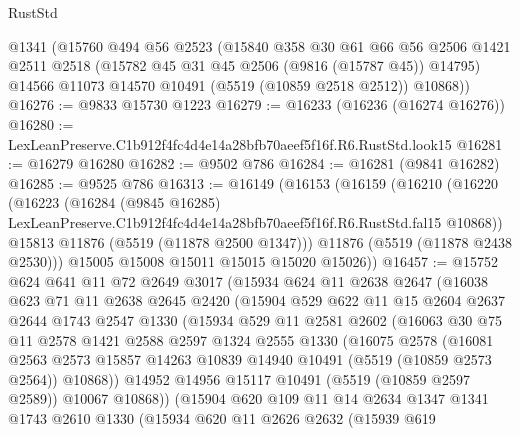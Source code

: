 \begin{lexlean}{RustStd}
\begin{coremodule}
    @1341
    (@15760
      @494
      @56
      @2523
      (@15840
        @358
        @30
        @61
        @66
        @56
        @2506
        @1421
        @2511
        @2518
        (@15782 @45 @31 @45 @2506 (@9816 (@15787 @45)) @14795)
        @14566
        @11073
        @14570
        @10491
        (@5519 (@10859 @2518 @2512))
        @10868))
@16276 := @9833 @15730 @1223
@16279 := @16233 (@16236 (@16274 @16276))
@16280 := LexLeanPreserve.C1b912f4fc4d4e14a28bfb70aeef5f16f.R6.RustStd.look15
@16281 := @16279 @16280
@16282 := @9502 @786
@16284 := @16281 (@9841 @16282)
@16285 := @9525 @786
@16313 := @16149
    (@16153
      (@16159
        (@16210
          (@16220
            (@16223
              (@16284
                (@9845 @16285)
                LexLeanPreserve.C1b912f4fc4d4e14a28bfb70aeef5f16f.R6.RustStd.fal15
                @10868))
            @15813
            @11876
            (@5519 (@11878 @2500 @1347)))
          @11876
          (@5519 (@11878 @2438 @2530)))
        @15005
        @15008
        @15011
        @15015
        @15020
        @15026))
@16457 := @15752
    @624
    @641
    @11
    @72
    @2649
    @3017
    (@15934
      @624
      @11
      @2638
      @2647
      (@16038
        @623
        @71
        @11
        @2638
        @2645
        @2420
        (@15904
          @529
          @622
          @11
          @15
          @2604
          @2637
          @2644
          @1743
          @2547
          @1330
          (@15934
            @529
            @11
            @2581
            @2602
            (@16063
              @30
              @75
              @11
              @2578
              @1421
              @2588
              @2597
              @1324
              @2555
              @1330
              (@16075
                @2578
                (@16081
                  @2563
                  @2573
                  @15857
                  @14263
                  @10839
                  @14940
                  @10491
                  (@5519 (@10859 @2573 @2564))
                  @10868))
              @14952
              @14956
              @15117
              @10491
              (@5519 (@10859 @2597 @2589))
              @10067
              @10868))
          (@15904
            @620
            @109
            @11
            @14
            @2634
            @1347
            @1341
            @1743
            @2610
            @1330
            (@15934
              @620
              @11
              @2626
              @2632
              (@15939
                @619

\end{coremodule}
\end{lexlean}
